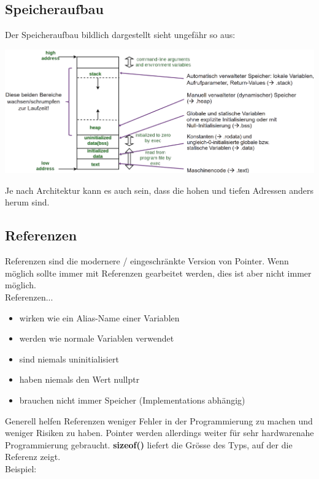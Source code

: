 \nextcol

\subsection{Speicheraufbau}

Der Speicheraufbau bildlich dargestellt sieht ungefähr so aus:

\begin{center}
    \includegraphics[width=\columnwidth]{pictures/memorylayout.png}  
\end{center}

Je nach Architektur kann es auch sein, dass die hohen und tiefen Adressen anders herum sind.

\subsection{Referenzen}

Referenzen sind die modernere / eingeschränkte Version von Pointer. 
Wenn möglich sollte immer mit Referenzen gearbeitet werden, dies ist aber nicht immer möglich.\\

Referenzen...
\begin{itemize}[itemsep=1pt, parsep=0pt]
    \item wirken wie ein Alias-Name einer Variablen
    \item werden wie normale Variablen verwendet
    \item sind niemals uninitialisiert
    \item haben niemals den Wert nullptr
    \item brauchen nicht immer Speicher (Implementations abhängig)
\end{itemize}

Generell helfen Referenzen weniger Fehler in der Programmierung zu machen und weniger Risiken zu haben. 
Pointer werden allerdings weiter für sehr hardwarenahe Programmierung gebraucht. 
\textbf{sizeof()} liefert die Grösse des Typs, auf der die Referenz zeigt.\\
Beispiel:

